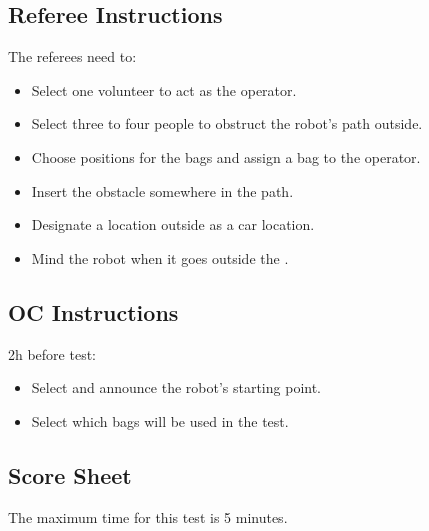 \subsection*{Referee Instructions}

The referees need to:
\begin{itemize}[nosep]
	\item Select one volunteer to act as the operator.
    \item Select three to four people to obstruct the robot's path outside.
	\item Choose positions for the bags and assign a bag to the operator.
    \item Insert the obstacle somewhere in the path.
	\item Designate a location outside as a car location.
	\item Mind the robot when it goes outside the \Arena{}.
\end{itemize}

\subsection*{OC Instructions}

2h before test:
\begin{itemize}[nosep]
	\item Select and announce the robot's starting point.
	\item Select which bags will be used in the test.
\end{itemize}

\subsection*{Score Sheet}

The maximum time for this test is 5 minutes.

